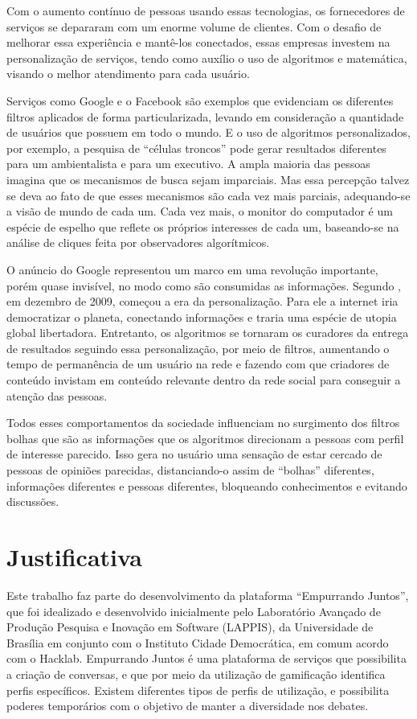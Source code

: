 Com o aumento contínuo de pessoas usando essas tecnologias, os fornecedores de serviços se depararam com um enorme volume de clientes. Com o desafio de  melhorar essa experiência e mantê-los conectados, essas empresas investem na personalização de serviços,  tendo como auxílio o uso de algoritmos e matemática, visando o melhor atendimento para cada usuário.

Serviços como Google e o Facebook são exemplos que evidenciam os diferentes filtros aplicados de forma particularizada, levando em consideração a quantidade de usuários que possuem em todo o mundo. E o uso de algoritmos personalizados, por exemplo, a pesquisa de “células troncos” pode gerar resultados diferentes para um ambientalista e para um executivo. A ampla maioria das pessoas imagina que os mecanismos de busca sejam imparciais. Mas essa percepção talvez se deva ao fato de que esses mecanismos são cada vez mais parciais, adequando-se a visão de mundo de cada um. Cada vez mais, o monitor do computador é um espécie de espelho que reflete os próprios interesses de cada um, baseando-se na análise de cliques feita por observadores algorítmicos. \cite{pariser2012}

O anúncio do Google representou um marco em uma revolução importante, porém quase invisível, no modo como são consumidas as informações. Segundo \cite{pariser2012}, em dezembro de 2009, começou a era da personalização. Para ele a internet iria democratizar o planeta, conectando informações e traria uma espécie de utopia global libertadora. Entretanto, os algoritmos se tornaram os curadores da entrega de resultados seguindo essa personalização, por meio de filtros, aumentando o tempo de permanência de um usuário na rede e fazendo com que criadores de conteúdo invistam em conteúdo relevante dentro da rede social para conseguir a atenção das pessoas.

Todos esses comportamentos da sociedade influenciam no surgimento dos filtros bolhas que são as informações que os algoritmos direcionam a pessoas com perfil de interesse parecido. Isso gera no usuário uma sensação de estar cercado de pessoas de opiniões parecidas, distanciando-o assim de “bolhas” diferentes, informações diferentes e pessoas diferentes, bloqueando conhecimentos e evitando discussões.

\section{Justificativa}

Este trabalho faz parte do desenvolvimento da plataforma “Empurrando Juntos”, que foi idealizado e desenvolvido inicialmente pelo Laboratório Avançado de Produção Pesquisa e Inovação em Software (LAPPIS), da Universidade de Brasília em conjunto com o Instituto Cidade Democrática, em comum acordo com o Hacklab. 
Empurrando Juntos é uma plataforma de serviços que possibilita a criação de conversas, e que por meio da utilização de gamificação identifica perfis específicos. Existem diferentes tipos de perfis de utilização, e possibilita poderes temporários com o objetivo de manter a diversidade nos debates.

